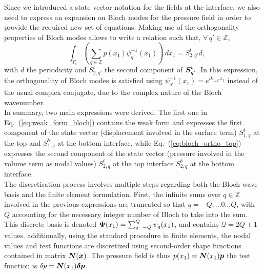 Since we introduced a state vector notation for the fields at the interface, we also need to express an expansion on Bloch modes for the pressure field in order to provide the required new set of equations. Making use of the orthogonality properties of Bloch modes allows to write a relation such that, $\forall \,q' \in \mathbb Z$,
\begin{equation}
        \quad\int_{\Gamma_t} \left(\sum_{q \in \mathbb Z} p(x_1) \psi_{q'}^{-1}(x_1) \right) \,dx_1 = S^t_{2,q'} d,
    \label{eq:bloch_ortho_top}
\end{equation}
with $d$ the periodicity and $S_{2,q'}^t$ the second component of $\boldsymbol S_{q'}^t$. In this expression, the orthogonality of Bloch modes is satisfied using $\psi_{q'}^{-1}(x_1)= e^{ik_{1,q'}x_1}$ instead of the usual complex conjugate, due to the complex nature of the Bloch wavenumber.\\

In summary, two main expressions were derived. The first one in Eq.~(\ref{eq:weak_form_bloch}) contains the weak form and expresses the first component of the state vector (displacement involved in the surface term) $S_{1,q}^t$ at the top and $ S_{1,q}^b$ at the bottom interface, while Eq.~(\ref{eq:bloch_ortho_top}) expresses the second component of the state vector (pressure involved in the volume term as nodal values) $S_{2,q}^t$ at the top interface $S_{2,q}^b$ at the bottom interface. \\

The discretisation process involves multiple steps regarding both the Bloch wave basis and the finite element formulation. First, the infinite sums over $q\in \mathbb Z$ involved in the previous expressions are truncated so that $q = -Q,\ldots0\ldots Q$, with $Q$ accounting for the necessary integer number of Bloch to take into the sum. This discrete basis is denoted $\boldsymbol \Psi(x_1) = \sum_{q =-Q}^Q \psi_q(x_1)$, and contains $\mathcal Q = 2Q+1$ values. additionally, using the standard procedure in finite elements, the nodal values and test functions are discretized using second-order shape functions contained in matrix $\boldsymbol N(\boldsymbol x)$. The pressure field is thus $p(x_1) = \boldsymbol N(x_1) \boldsymbol p$ the test function is ${\delta p} = \boldsymbol N(x_1) \boldsymbol {\delta p}$.

